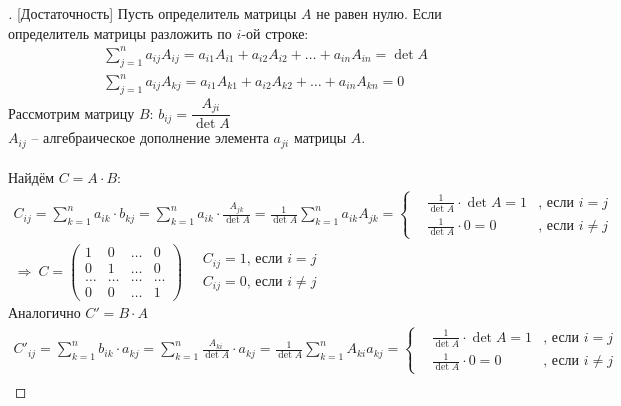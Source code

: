 \begin{proof}[][Достаточность]
	Пусть определитель матрицы $A$ не равен нулю. Если определитель матрицы разложить по $i$-ой строке:
	\begin{align*}
		&\sum^n_{j=1} a_{ij}A_{ij} = a_{i1}A_{i1} + a_{i2}A_{i2} + \ldots + a_{in}A_{in} = \det A\\
		&\sum^n_{j=1} a_{ij}A_{kj} = a_{i1}A_{k1} + a_{i2}A_{k2} + \ldots + a_{in}A_{kn} = 0
	\end{align*}
	Рассмотрим матрицу $B$: $b_{ij} = \dfrac{A_{ji}}{\det A}$ \\ 
	$A_{ij}$ -- алгебраическое дополнение элемента $a_{ji}$ матрицы $A$.\\ \vspace{-\topsep}
	\\ Найдём $C=A\cdot B$: \vspace{-\topsep}
	\begin{gather*}
		C_{ij} = \sum^n_{k=1} a_{ik} \cdot b_{kj} = \sum^n_{k=1}a_{ik} \cdot \frac{A_{jk}}{\det A} = \frac{1}{\det A} \sum^n_{k=1} a_{ik}A_{jk} = \left\{ \begin{aligned}
		&\frac{1}{\det A} \cdot \det A = 1 &\text{, если } i=j \\
		&\frac{1}{\det A} \cdot 0 = 0 &\text{, если } i\ne j
		\end{aligned} \right.\\
		\Rightarrow\ C = \begin{pmatrix}
			1 & 0 & \ldots & 0\\
			0 & 1 & \ldots & 0\\
			\ldots & \ldots & \ldots & \ldots \\
			0 & 0 & \ldots & 1
		\end{pmatrix}\quad \begin{array}{l}
			C_{ij} = 1 \text{, если } i = j\\
			C_{ij} = 0 \text{, если } i \ne j
		\end{array}
	\end{gather*}
	Аналогично $C' = B\cdot A$ \vspace{-\topsep}
	\begin{gather*}
		C'_{ij} = \sum^n_{k =1} b_{ik} \cdot a_{kj} = \sum^n_{k=1} \frac{A_{ki}}{\det A} \cdot a_{kj} = \frac{1}{\det A} \sum^n_{k=1} A_{ki}a_{kj} = \left\{ \begin{aligned}
		&\frac{1}{\det A} \cdot \det A = 1 &\text{, если } i = j\\
		&\frac{1}{\det A} \cdot 0 = 0 &\text{, если } i\ne j
		\end{aligned} \right.\\

\end{gather*}
\end{proof}

